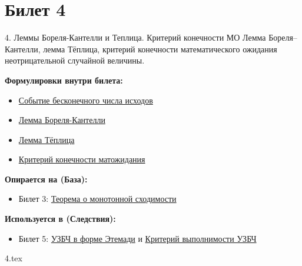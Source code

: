 \documentclass[a4paper, 12pt]{article}
\newcommand{\ticketsection}[1]{\vspace{0.5em}\noindent\textbf{\textcolor{ticketdark}{\sffamily #1}}\par}
\begin{document}
\section{Билет 4}
\begin{ticketskeleton}{4. Леммы Бореля-Кантелли и Теплица. Критерий конечности МО}
     Лемма Бореля--Кантелли, лемма Тёплица, критерий конечности математического ожидания неотрицательной случайной величины.

    \ticketsection{Формулировки внутри билета:}
    \begin{itemize}
        \item \hyperref[def:inf_events]{ Событие бесконечного числа исходов}
        \item \hyperref[lem:borel_cantelli]{ Лемма Бореля-Кантелли}
        \item \hyperref[lem:toeplitz]{ Лемма Тёплица}
        \item \hyperref[prop:crit_exp]{ Критерий конечности матожидания}
    \end{itemize}

    \ticketsection{Опирается на (База):}
    \begin{itemize}
        \item Билет 3: \hyperref[thm:monotone]{Теорема о монотонной сходимости}
    \end{itemize}

    \ticketsection{Используется в (Следствия):}
    \begin{itemize}
        \item Билет 5: \hyperref[thm:slln_etemadi]{УЗБЧ в форме Этемади} и \hyperref[cor:crit_slln]{Критерий выполнимости УЗБЧ}
    \end{itemize}
\end{ticketskeleton}
{4.tex}
\end{document}
